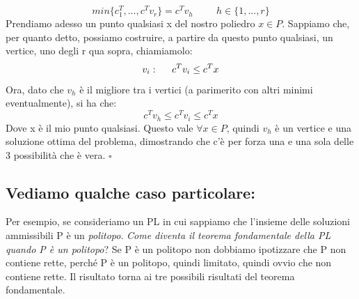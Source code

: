 \begin{equation*}
    min\{c^T_1, ..., c^Tv_r\} = c^Tv_h \hspace{1cm} h \in \{1,...,r\}
\end{equation*}
Prendiamo adesso un punto qualsiasi x del nostro poliedro $x \in P$. Sappiamo che, per quanto detto, possiamo costruire, a partire da questo punto qualsiasi, un vertice, uno degli r qua sopra, chiamiamolo:
\begin{equation*}
    v_i: \hspace{0.5cm} c^Tv_i \leq c^Tx
\end{equation*}
Ora, dato che $v_h$ è il migliore tra i vertici (a parimerito con altri minimi eventualmente), si ha che:
\begin{equation*}
    c^Tv_h \leq c^Tv_i \leq c^Tx
\end{equation*}
Dove x è il mio punto qualsiasi. Questo vale $\forall x \in P$, quindi $v_h$ è un vertice e una soluzione ottima del problema, dimostrando che c'è per forza una e una sola delle 3 possibilità che è vera. $\square$



\subsection{Vediamo qualche caso particolare:} Per esempio, se consideriamo un PL in cui sappiamo che l'insieme delle soluzioni ammissibili P è un \textit{politopo}. \textit{Come diventa il teorema fondamentale della PL quando P è un politopo}? Se P è un politopo non dobbiamo ipotizzare che P non contiene rette, perché P è un politopo, quindi limitato, quindi ovvio che non contiene rette. Il risultato torna ai tre possibili risultati del teorema fondamentale.

\vspace{1cm}

